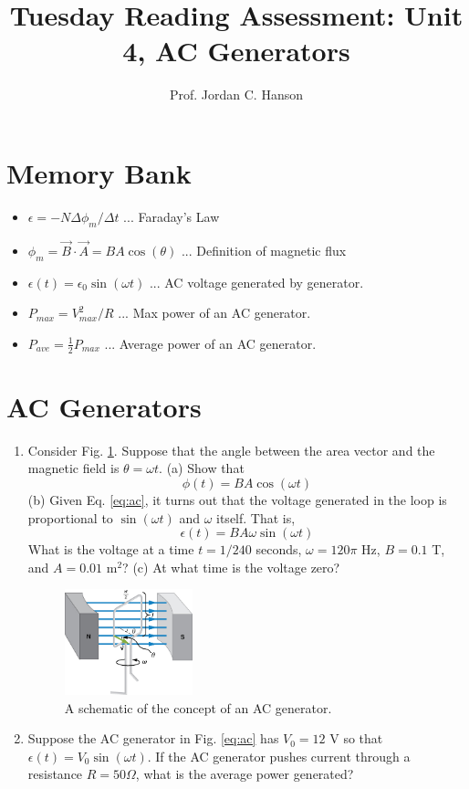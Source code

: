 \documentclass{article}
\begin{document}
\title{Tuesday Reading Assessment: Unit 4, AC Generators}
\author{Prof. Jordan C. Hanson}

\maketitle

\section{Memory Bank}

\begin{itemize}
\item $\epsilon = -N \Delta \phi_m /\Delta t$ ... Faraday's Law
\item $\phi_m = \vec{B} \cdot \vec{A} = BA \cos(\theta)$ ... Definition of magnetic flux
\item $\epsilon(t) = \epsilon_0 \sin(\omega t)$ ... AC voltage generated by generator.
\item $P_{max} = V_{max}^2/R$ ... Max power of an AC generator.
\item $P_{ave} = \frac{1}{2} P_{max}$ ... Average power of an AC generator.
\end{itemize}

\section{AC Generators}

\begin{enumerate}
\item Consider Fig. \ref{fig:acgen}.  Suppose that the angle between the area vector and the magnetic field is $\theta = \omega t$.  (a) Show that
\begin{equation}
\phi(t) = BA\cos(\omega t) \label{eq:ac}
\end{equation}
(b) Given Eq. \ref{eq:ac}, it turns out that the voltage generated in the loop is proportional to $\sin(\omega t)$ and $\omega$ itself.  That is,
\begin{equation}
\epsilon(t) = BA\omega \sin(\omega t)
\end{equation}
What is the voltage at a time $t = 1/240$ seconds, $\omega = 120\pi$ Hz, $B = 0.1$ T, and $A = 0.01$ m$^2$? (c) At what time is the voltage zero?
\begin{figure}[hb]
\centering
\includegraphics[width=0.35\textwidth]{acGen.jpeg}
\caption{\label{fig:acgen} A schematic of the concept of an AC generator.}
\end{figure}
\item Suppose the AC generator in Fig. \ref{eq:ac} has $V_0 = 12$ V so that $\epsilon(t) = V_0 \sin(\omega t)$.  If the AC generator pushes current through a resistance $R = 50\Omega$, what is the average power generated?
\end{enumerate}
\end{document}
